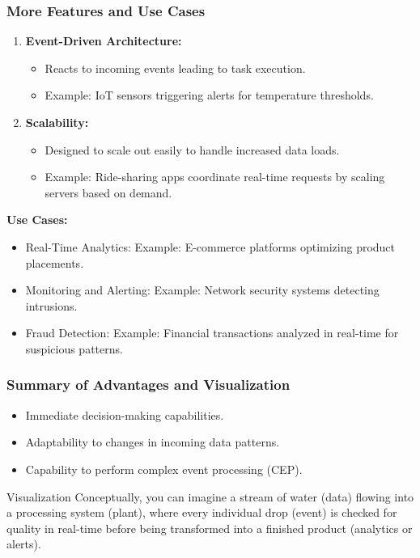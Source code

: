 \documentclass[aspectratio=169]{beamer}
\begin{document}
\begin{frame}[fragile]
    \frametitle{More Features and Use Cases}
    \begin{enumerate}[resume]
        \item \textbf{Event-Driven Architecture:}
            \begin{itemize}
                \item Reacts to incoming events leading to task execution.
                \item Example: IoT sensors triggering alerts for temperature thresholds.
            \end{itemize}
        \item \textbf{Scalability:}
            \begin{itemize}
                \item Designed to scale out easily to handle increased data loads.
                \item Example: Ride-sharing apps coordinate real-time requests by scaling servers based on demand.
            \end{itemize}
    \end{enumerate}
    
    \textbf{Use Cases:}
    \begin{itemize}
        \item Real-Time Analytics: Example: E-commerce platforms optimizing product placements.
        \item Monitoring and Alerting: Example: Network security systems detecting intrusions.
        \item Fraud Detection: Example: Financial transactions analyzed in real-time for suspicious patterns.
    \end{itemize}
\end{frame}

\begin{frame}[fragile]
    \frametitle{Summary of Advantages and Visualization}
    \begin{itemize}
        \item Immediate decision-making capabilities.
        \item Adaptability to changes in incoming data patterns.
        \item Capability to perform complex event processing (CEP).
    \end{itemize}

    \begin{block}{Visualization}
        Conceptually, you can imagine a stream of water (data) flowing into a processing system (plant), where every individual drop (event) is checked for quality in real-time before being transformed into a finished product (analytics or alerts).
    \end{block}
\end{frame}
\end{document}
